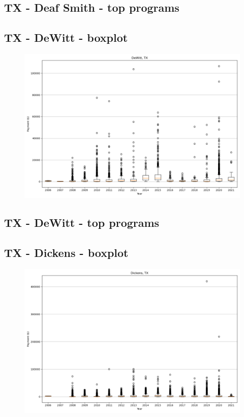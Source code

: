 \subsection*{TX - Deaf Smith - top programs}

\newpage
\subsection*{TX - DeWitt - boxplot}
\begin{figure}[h]
\centering
\includegraphics[width=7in]{../output/boxplots/counties/DeWitt-TX_boxplot.png}
\end{figure}


\subsection*{TX - DeWitt - top programs}

\newpage
\subsection*{TX - Dickens - boxplot}
\begin{figure}[h]
\centering
\includegraphics[width=7in]{../output/boxplots/counties/Dickens-TX_boxplot.png}
\end{figure}


